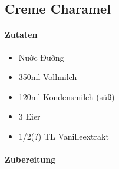 \newpage
{}
\subsection{Creme Charamel}
\paragraph{Zutaten}
\begin{itemize}[noitemsep]
	\item Nước Đường
	\item 350ml Vollmilch
	\item 120ml Kondensmilch (süß) 
	\item 3 Eier
	\item 1/2(?)	 TL Vanilleextrakt 
\end{itemize}
\paragraph{Zubereitung}
